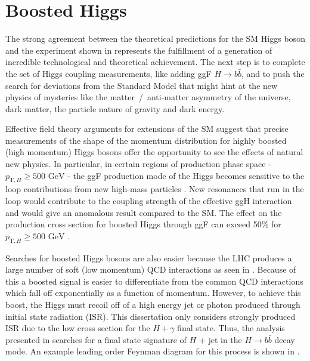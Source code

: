 \section{Boosted Higgs} \label{sec:higgs:boosted}

The strong agreement between the theoretical predictions for the SM Higgs boson
and the experiment shown in  represents the
fulfillment of a generation of incredible technological and theoretical
achievement.  The next step is to complete the set of Higgs coupling
measurements, like adding ggF $H \rightarrow b\bar{b}$, and to push the search
for deviations from the Standard Model that might hint at the new physics of
mysteries like the matter~/~anti-matter asymmetry of the universe, dark matter,
the particle nature of gravity and dark energy. 

Effective field theory arguments for extensions of the SM suggest that precise
measurements of the shape of the momentum distribution for highly boosted (high
momentum) Higgs bosons offer the opportunity to see the effects of natural new
physics.  In particular, in certain regions of production phase space -
$p_{\text{T},H} \geq \text{500 GeV}$ - the ggF production mode of the Higgs becomes
sensitive to the loop contributions from new high-mass particles
\cite{Schlaffer:2014osa}.  New resonances that run in the loop would contribute
to the coupling strength of the effective ggH interaction and
would give an anomalous result compared to the SM. The effect on the
production cross section for boosted Higgs through ggF can exceed 50\% for
$p_{\text{T},H} \geq \text{500 GeV}$ \cite{Schlaffer:2014osa,Grojean:2013nya,Dawson:2015gka}.

Searches for boosted Higgs bosons are also easier because the LHC produces a
large number of soft (low momentum) QCD interactions as seen in
.  Because of this a boosted signal is easier
to differentiate from the common QCD interactions which fall off exponentially
as a function of momentum.  However, to achieve this boost, the Higgs must
recoil off of a high energy jet or photon \cite{Aaboud:2018zba} produced
through initial state radiation (ISR). This dissertation only considers
strongly produced ISR due to the low cross section for the $H + \gamma$ final
state.  Thus, the analysis presented in  searches for a final
state signature of $H$ + jet in the $H \rightarrow b\bar{b}$ decay mode.  An
example leading order Feynman diagram for this process is shown in
.


